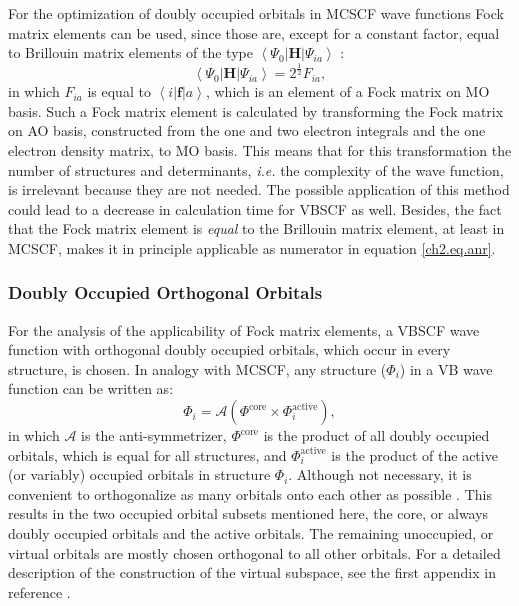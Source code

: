 For the optimization of doubly occupied orbitals in MCSCF wave functions Fock matrix elements can be used, since those are, except for a constant factor, equal to Brillouin matrix elements of the type $\left < \Psi_0 | \mathbf{H} | \Psi_{ia} \right >$ \cite{roos1,roos2}:
\begin{equation}
\left < \Psi_0 | \mathbf{H} | \Psi_{ia} \right > = 2^{\frac{1}{2}}F_{ia},
\label{ch2.eq.mcscffock}
\end{equation}
in which $F_{ia}$ is equal to $\left < i | \mathbf{f} | a \right > $, which is an element of a Fock matrix on MO basis. Such a Fock matrix element is calculated by transforming the Fock matrix on AO basis, constructed from the one and two electron integrals and the one electron density matrix, to MO basis. This means that for this transformation the number of structures and determinants, \textit{i.e.} the complexity of the wave function, is irrelevant because they are not needed. The possible application of this method could lead to a decrease in calculation time for VBSCF as well. Besides, the fact that the Fock matrix element is \textit{equal} to the Brillouin matrix element, at least in MCSCF, makes it in principle applicable as numerator in equation \ref{ch2.eq.anr}.  

\subsubsection{Doubly Occupied Orthogonal Orbitals}

For the analysis of the applicability of Fock matrix elements, a VBSCF wave function with orthogonal doubly occupied orbitals, which occur in every structure, is chosen. In analogy with MCSCF, any structure ($\Phi_i$) in a VB wave function can be written as:
\begin{equation}
\Phi_i = \mathcal{A}(\Phi^{\mathrm{core}} \times \Phi_i^{\mathrm{active}}),
\label{ch2.eq.wfsplit}
\end{equation}
in which $\mathcal{A}$ is the anti-symmetrizer, $\Phi^{\mathrm{core}}$ is the product of all doubly occupied orbitals, which is equal for all structures, and $\Phi_i^{\mathrm{active}}$ is the product of the active (or variably) occupied orbitals in structure $\Phi_i$. Although not necessary, it is convenient to orthogonalize as many orbitals onto each other as possible \cite{vbscf2}. This results in the two occupied orbital subsets mentioned here, the core, or always doubly occupied orbitals and the active orbitals. The remaining unoccupied, or virtual orbitals are mostly chosen orthogonal to all other orbitals. For a detailed description of the construction of the virtual subspace, see the first appendix in reference \cite{koos1}.

